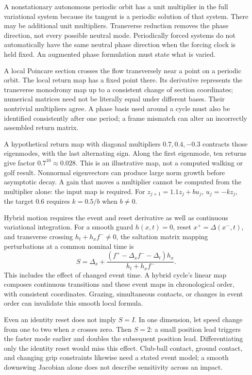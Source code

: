 \documentclass[12pt, openany]{book}
\theoremstyle{plain}
\begin{document}
A nonstationary autonomous periodic orbit has a unit multiplier in the full
variational system because its tangent is a periodic solution of that system.
There may be additional unit multipliers. Transverse reduction removes the
phase direction, not every possible neutral mode. Periodically forced systems
do not automatically have the same neutral phase direction when the forcing
clock is held fixed. An augmented phase formulation must state what is varied.

A local Poincare section crosses the flow transversely near a point on a
periodic orbit. The local return map has a fixed point there. Its derivative
represents the transverse monodromy map up to a consistent change of section
coordinates; numerical matrices need not be literally equal under different
bases. Their nontrivial multipliers agree. A phase basis used around a cycle
must also be identified consistently after one period; a frame mismatch can
alter an incorrectly assembled return matrix.

A hypothetical return map with diagonal multipliers $0.7,0.4,-0.3$ contracts
those eigenmodes, with the last alternating sign. Along the first eigenmode,
ten returns give factor $0.7^{10}\approx0.028$. This is an illustrative map,
not a computed walking or golf result. Nonnormal eigenvectors can produce
large norm growth before asymptotic decay. A gain that moves a multiplier
cannot be computed from the multiplier alone: the input map is required.
For $z_{j+1}=1.1z_j+b u_j$, $u_j=-kz_j$, the target $0.6$ requires
$k=0.5/b$ when $b\ne0$.

Hybrid motion requires the event and reset derivative as well as continuous
variational integration. For a smooth guard $h(x,t)=0$, reset
$x^+=\Delta(x^-,t)$, and transverse crossing
$h_t+h_xf^-\ne0$, the saltation matrix mapping perturbations at a common
nominal time is
\begin{equation}\label{eq:orbital_saltation}
 S=\Delta_x+
 \frac{(f^+-\Delta_x f^--\Delta_t)h_x}{h_t+h_xf^-}.
\end{equation}
This includes the effect of changed event time. A hybrid cycle's linear map
composes continuous transitions and these event maps in chronological order,
with consistent coordinates. Grazing, simultaneous contacts, or changes in
event order can invalidate this smooth local formula.

Even an identity reset does not imply $S=I$. In one dimension, let speed
change from one to two when $x$ crosses zero. Then $S=2$: a small position
lead triggers the faster mode earlier and doubles the subsequent position
lead. Differentiating only the identity reset would miss this effect.
Club-ball contact, ground contact, and changing grip constraints likewise
need a stated event model; a smooth downswing Jacobian alone does not
describe sensitivity across an impact.
\end{document}
